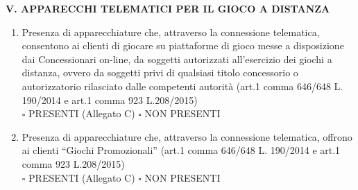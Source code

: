 \documentclass[12pt]{article}
\begin{document}
\begin{center}
    \textbf{V. APPARECCHI TELEMATICI PER IL GIOCO A DISTANZA}
\end{center}
\begin{enumerate}[resume]
    \item Presenza di apparecchiature che, attraverso la connessione telematica, consentono ai clienti di giocare su piattaforme di gioco messe a disposizione dai Concessionari on-line, da soggetti autorizzati all’esercizio dei giochi a distanza, ovvero da soggetti privi di qualsiasi titolo concessorio o autorizzatorio rilasciato dalle competenti autorità (art.1 comma 646/648 L. 190/2014 e art.1 comma 923 L.208/2015)
    \\\begin{math} \square\end{math} PRESENTI (Allegato C) \begin{math}\square\end{math} NON PRESENTI
    \item Presenza di apparecchiature che, attraverso la connessione telematica, offrono ai clienti “Giochi Promozionali” (art.1 comma 646/648 L. 190/2014 e art.1 comma 923 L.208/2015)
    \\\begin{math} \square\end{math} PRESENTI (Allegato C) \begin{math}\square\end{math} NON PRESENTI
\end{enumerate}
\end{document}
